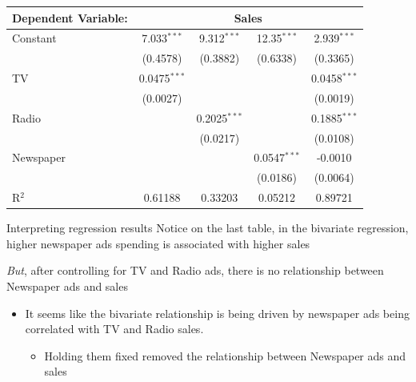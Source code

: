 \documentclass[aspectratio=169,t,11pt,table]{beamer}
\begin{document}
\begin{frame}{}{}
  \bigskip
  \begin{center}
    \small
    \begin{tabular}{lcccc}
      \toprule
      Dependent Variable: & \multicolumn{4}{c}{Sales}\\
      \midrule
      Constant     & 7.033$^{***}$  & 9.312$^{***}$  & 12.35$^{***}$  & 2.939$^{***}$\\   
                    & (0.4578)       & (0.3882)       & (0.6338)       & (0.3365)\\   
      TV           & 0.0475$^{***}$ &                &                & 0.0458$^{***}$\\   
                    & (0.0027)       &                &                & (0.0019)\\   
      Radio        &                & 0.2025$^{***}$ &                & 0.1885$^{***}$\\   
                    &                & (0.0217)       &                & (0.0108)\\   
      Newspaper    &                &                & 0.0547$^{***}$ & -0.0010\\   
                    &                &                & (0.0186)       & (0.0064)\\   
      \midrule
      R$^2$        & 0.61188        & 0.33203        & 0.05212        & 0.89721\\  
      \bottomrule
    \end{tabular}
  \end{center}
\end{frame}

\begin{frame}{Interpreting regression results}
  Notice on the last table, in the bivariate regression, higher newspaper ads spending is associated with higher sales


  \bigskip
  \emph{But}, after controlling for TV and Radio ads, there is no relationship between Newspaper ads and sales
  \begin{itemize}
    \item It seems like the bivariate relationship is being driven by newspaper ads being correlated with TV and Radio sales. 
    \begin{itemize}
      \item Holding them fixed removed the relationship between Newspaper ads and sales
    \end{itemize}
  \end{itemize}
\end{frame}
\end{document}
